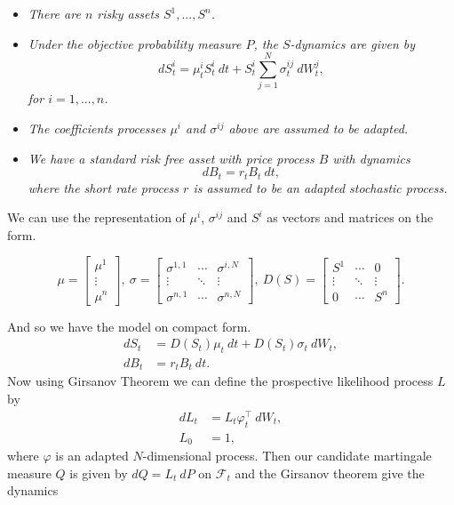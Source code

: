 \documentclass[
]{book}
\providecommand{\tightlist}{%
  \setlength{\itemsep}{0pt}\setlength{\parskip}{0pt}}
\begin{document}
\begin{itemize}
\tightlist
\item
  \emph{There are \(n\) risky assets \(S^1,...,S^n\).}
\item
  \emph{Under the objective probability measure \(P\), the \(S\)-dynamics are given by}
  \[
    dS_t^i=\mu_t^iS_t^i\ dt +S_t^i\sum_{j=1}^N\sigma_t^{ij}\ dW_t^j,\tag{14.1}
    \]
  \emph{for \(i=1,...,n\).}
\item
  \emph{The coefficients processes \(\mu^i\) and \(\sigma^{ij}\) above are assumed to be adapted.}
\item
  \emph{We have a standard risk free asset with price process \(B\) with dynamics}
  \[
    dB_t=r_tB_t\ dt,\tag{14.2}
    \]
  \emph{where the short rate process \(r\) is assumed to be an adapted stochastic process.}
\end{itemize}

We can use the representation of \(\mu^i\), \(\sigma^{ij}\) and \(S^i\) as vectors and matrices on the form.

\[
\mu =
\begin{bmatrix}
\mu ^1\\
\vdots\\
\mu ^n
\end{bmatrix},\ \sigma=
\begin{bmatrix}
\sigma^{1,1}& \cdots & \sigma^{i,N}\\
\vdots & \ddots & \vdots\\
\sigma^{n,1}&\cdots&\sigma^{n,N}
\end{bmatrix},\ D(S)=
\begin{bmatrix}
S^{1}& \cdots & 0\\
\vdots & \ddots & \vdots\\
0&\cdots&S^n
\end{bmatrix}.
\]

And so we have the model on compact form.
\begin{align*}
dS_t&= D(S_t)\mu_t\ dt+D(S_t)\sigma_t\ dW_t,\tag{14.3}\\
dB_t&=r_tB_t\ dt.\tag{14.4}
\end{align*}
Now using Girsanov Theorem we can define the prospective likelihood process \(L\) by
\begin{align*}
dL_t&=L_t\varphi_t^\top\ dW_t,\tag{14.5}\\
L_0&=1,\tag{14.6}
\end{align*}
where \(\varphi\) is an adapted \(N\)-dimensional process. Then our candidate martingale measure \(Q\) is given by \(dQ=L_t\ dP\) on \(\mathcal{F}_t\) and the Girsanov theorem give the dynamics
\end{document}

